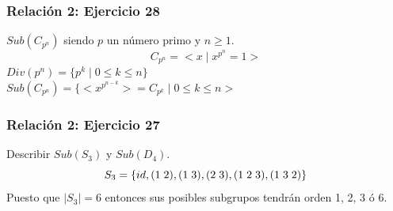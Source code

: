 \documentclass[11pt,a4paper]{article}
\begin{document}
\subsubsection*{Relación 2: Ejercicio 28}

$Sub(C_{p^{n}})$ siendo $p$ un número primo y $n \geq 1$.
$$C_{p^{n}} = < x \mid x^{p^{n}} = 1>$$
$Div(p^{n}) = \{ p^{k} \mid 0 \leq k \leq n \}$ \\
$Sub(C_{p^{n}}) = \{<x^{p^{n-k}}> = C_{p^{k}} \mid 0 \leq k \leq n>$

\subsubsection*{Relación 2: Ejercicio 27}

Describir $Sub(S_{3})$ y $Sub(D_{4})$.
$$S_{3} = \{ id, (1 \hspace{0.1cm} 2), (1\hspace{0.1cm} 3), (2 \hspace{0.1cm} 3), (1 \hspace{0.1cm} 2 \hspace{0.1cm} 3), (1 \hspace{0.1cm} 3 \hspace{0.1cm} 2) \}$$
Puesto que $|S_{3}| = 6$ entonces sus posibles subgrupos tendrán orden 1, 2, 3 ó 6.
\end{document}
